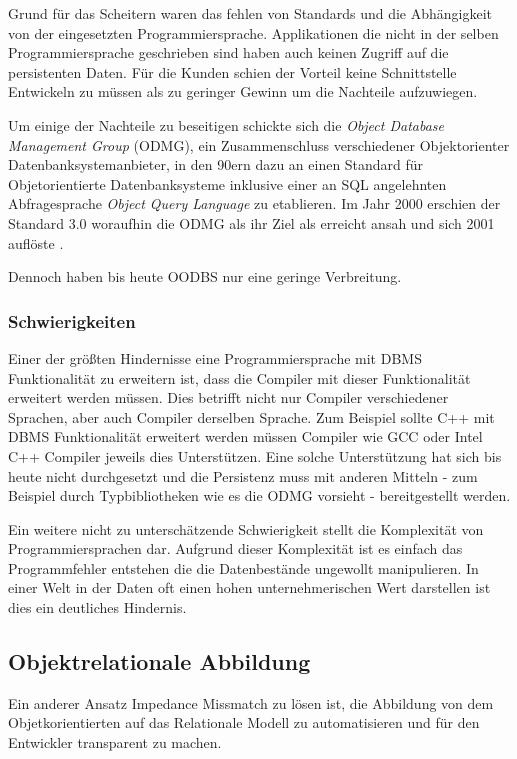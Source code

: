 
Grund für das Scheitern waren das fehlen von Standards und die Abhängigkeit von der eingesetzten Programmiersprache. Applikationen die nicht in der selben Programmiersprache geschrieben sind haben auch keinen Zugriff auf die persistenten Daten. Für die Kunden schien der Vorteil keine Schnittstelle Entwickeln zu müssen als zu geringer Gewinn \cite{stonebraker} um die Nachteile aufzuwiegen.

Um einige der Nachteile zu beseitigen schickte sich die \emph{Object Database Management Group} (ODMG), ein Zusammenschluss verschiedener Objektorienter Datenbanksystemanbieter, in den 90ern dazu an einen Standard für Objetorientierte Datenbanksysteme inklusive einer an SQL angelehnten Abfragesprache \emph{Object Query Language} zu etablieren. Im Jahr 2000 erschien der Standard 3.0 woraufhin die ODMG als ihr Ziel als erreicht ansah und sich 2001 auflöste \cite{http://www.odbms.org/odmg-standard/}.

Dennoch haben bis heute OODBS nur eine geringe Verbreitung.


\subsubsection{Schwierigkeiten}
Einer der größten Hindernisse eine Programmiersprache mit DBMS Funktionalität zu erweitern ist, dass die Compiler mit dieser Funktionalität erweitert werden müssen. Dies betrifft nicht nur Compiler verschiedener Sprachen, aber auch Compiler derselben Sprache. Zum Beispiel sollte C++ mit DBMS Funktionalität erweitert werden müssen Compiler wie GCC oder Intel C++ Compiler jeweils dies Unterstützen. Eine solche Unterstützung hat sich bis heute nicht durchgesetzt und die Persistenz muss mit anderen Mitteln - zum Beispiel durch Typbibliotheken wie es die ODMG vorsieht - bereitgestellt werden.

Ein weitere nicht zu unterschätzende Schwierigkeit stellt die Komplexität von Programmiersprachen dar. Aufgrund dieser Komplexität ist es einfach das Programmfehler entstehen die die Datenbestände ungewollt manipulieren. In einer Welt in der Daten oft einen hohen unternehmerischen Wert darstellen ist dies ein deutliches Hindernis. 


\subsection{Objektrelationale Abbildung}
Ein anderer Ansatz Impedance Missmatch zu lösen ist, die Abbildung von dem Objetkorientierten auf das Relationale Modell zu automatisieren und für den Entwickler transparent zu machen.

